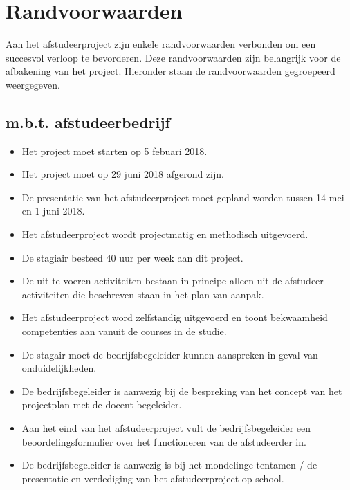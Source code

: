 \chapter{Randvoorwaarden}
Aan het afstudeerproject zijn enkele randvoorwaarden verbonden om een succesvol verloop te bevorderen. Deze randvoorwaarden zijn belangrijk voor de afbakening van het project. Hieronder staan de randvoorwaarden gegroepeerd weergegeven.\par

\section{m.b.t. afstudeerbedrijf}
\begin{itemize}
  \item Het project moet starten op 5 febuari 2018.
  \item Het project moet op 29 juni 2018 afgerond zijn.
  \item De presentatie van het afstudeerproject moet gepland worden tussen 14 mei en 1 juni 2018.
  \item Het afstudeerproject wordt projectmatig en methodisch uitgevoerd.
  \item De stagiair besteed 40 uur per week aan dit project.
  \item De uit te voeren activiteiten bestaan in principe alleen uit de afstudeer activiteiten die beschreven staan in het plan van aanpak.
  \item Het afstudeerproject word zelfstandig uitgevoerd en toont bekwaamheid competenties aan vanuit de courses in de studie.
  \item De stagair moet de bedrijfsbegeleider kunnen aanspreken in geval van onduidelijkheden.
  \item De bedrijfsbegeleider is aanwezig bij de bespreking van het concept van het projectplan met de docent begeleider.
  \item Aan het eind van het afstudeerproject vult de bedrijfsbegeleider een beoordelingsformulier over het functioneren van de afstudeerder in.
  \item De bedrijfsbegeleider is aanwezig is bij het mondelinge tentamen / de presentatie en verdediging van het afstudeerproject op school.
\end{itemize}

